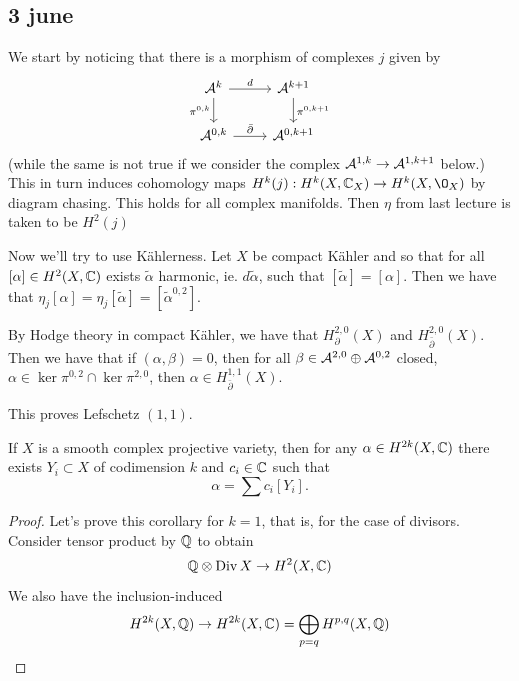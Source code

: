 \subsection{3 june}
We start by noticing that there is a morphism of complexes $j$ given by
\[\begin{tikzcd}
	\Ac^{k}\arrow[r,"d"]\arrow[d,"\pi^{0,k}",swap]&\Ac^{k+1}\arrow[d,"\pi^{0,k+1}"]\\
	\Ac^{0,k}\arrow[r,"\bar\partial"]&\Ac^{0,k+1}
\end{tikzcd}\]
(while the same is not true if we consider the complex $\mathcal{A}^{1,k}\to\mathcal{A}^{1,k+1}$ below.) This in turn induces cohomology maps $H^k(j):H^k(X,\C_X)\to H^k(X,\O_X)$ by diagram chasing. This holds for all complex manifolds. Then $\eta$ from last lecture is taken to be $H^2(j)$

Now we'll try to use Kählerness. Let $X$ be compact Kähler and so that for all $[\alpha]\in H^2(X,\mathbb{C})$ exists $\tilde\alpha$ harmonic, ie. $d\tilde\alpha$, such that $[\tilde\alpha]=[\alpha]$. Then we have that $\eta_j[\alpha]=\eta_j[\tilde\alpha]=[\tilde\alpha^{0,2}]$.

By Hodge theory in compact Kähler, we have that $H_\partial^{2,0}(X)$ and $H^{2,0}_{\bar\partial}(X)$. Then we have that if $(\alpha,\beta)=0$, then for all $\beta\in\mathcal{A}^{2,0}\oplus\mathcal{A}^{0,2}$ closed, $\alpha\in\ker\pi^{0,2}\cap\ker\pi^{2,0}$, then $\alpha\in H^{1,1}_{\bar\partial}(X)$.

This proves Lefschetz $(1,1)$.

\begin{coro}
	If $X$ is a smooth complex projective variety, then for any $\alpha\in H^{2k}(X,\mathbb{C})$ there exists $Y_i\subset X$ of codimension $k$ and $c_i\in\mathbb{C}$ such that
	\[\alpha=\sum c_i[Y_i].\]
\end{coro}
\begin{proof}
	Let's prove this corollary for $k=1$, that is, for the case of divisors. Consider tensor product by $\mathbb{Q}$ to obtain
	\[\mathbb{Q}\otimes\operatorname{Div} X\to H^2(X,\mathbb{C})\]
	We also have the inclusion-induced
	\[H^{2k}(X,\mathbb{Q})\to H^{2k}(X,\mathbb{C})=\bigoplus_{p=q}H^{p,q}(X,\mathbb{Q})\]
\end{proof}

